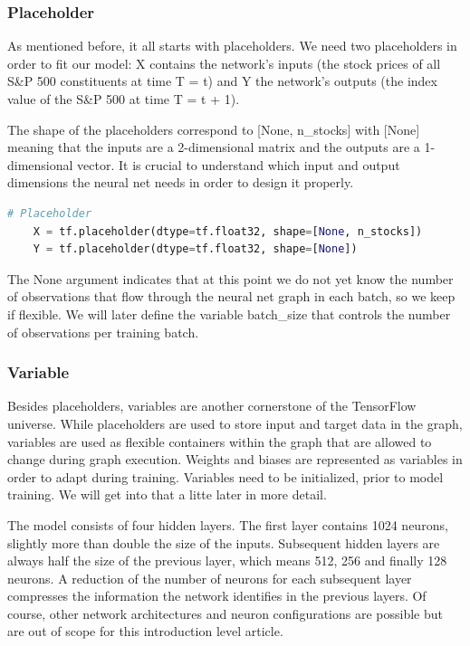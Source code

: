 \subsubsection{Placeholder}

As mentioned before, it all starts with placeholders. We need two placeholders in order to fit our model: X contains the network's inputs (the stock prices of all S\&P 500 constituents at time T = t) and Y the network's outputs (the index value of the S\&P 500 at time T = t + 1).

The shape of the placeholders correspond to [None, n\_stocks] with [None] meaning that the inputs are a 2-dimensional matrix and the outputs are a 1-dimensional vector. It is crucial to understand which input and output dimensions the neural net needs in order to design it properly.

\begin{lstlisting}[language=Python]
    # Placeholder
    X = tf.placeholder(dtype=tf.float32, shape=[None, n_stocks])
    Y = tf.placeholder(dtype=tf.float32, shape=[None])
\end{lstlisting}

The None argument indicates that at this point we do not yet know the number of observations that flow through the neural net graph in each batch, so we keep if flexible. We will later define the variable batch\_size that controls the number of observations per training batch.

\subsubsection{Variable}

Besides placeholders, variables are another cornerstone of the TensorFlow universe. While placeholders are used to store input and target data in the graph, variables are used as flexible containers within the graph that are allowed to change during graph execution. Weights and biases are represented as variables in order to adapt during training. Variables need to be initialized, prior to model training. We will get into that a litte later in more detail.

The model consists of four hidden layers. The first layer contains 1024 neurons, slightly more than double the size of the inputs. Subsequent hidden layers are always half the size of the previous layer, which means 512, 256 and finally 128 neurons. A reduction of the number of neurons for each subsequent layer compresses the information the network identifies in the previous layers. Of course, other network architectures and neuron configurations are possible but are out of scope for this introduction level article.

